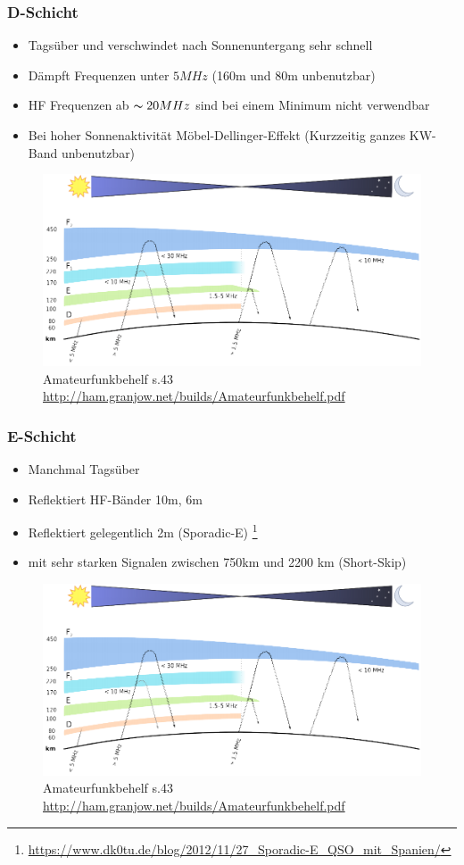 \begin{frame}
  \frametitle{D-Schicht}
  \begin{itemize}
    \item Tagsüber und verschwindet nach Sonnenuntergang sehr schnell
    \item Dämpft Frequenzen unter $5MHz$ (160m und 80m unbenutzbar)
    \item HF Frequenzen ab $\thicksim20MHz$ sind bei einem Minimum nicht verwendbar
    \item Bei hoher Sonnenaktivität Möbel-Dellinger-Effekt (Kurzzeitig ganzes KW-Band unbenutzbar)
  \end{itemize}
  \begin{center}
    \begin{figure}
      \includegraphics[width=.6\textwidth,height=.4\textheight,keepaspectratio]{e09/schichten_behelf_43.png}
      \caption{Amateurfunkbehelf s.43 \ExternalLink \url{http://ham.granjow.net/builds/Amateurfunkbehelf.pdf}}
    \end{figure}
  \end{center}
\end{frame}

\begin{frame}
  \frametitle{E-Schicht}
  \begin{itemize}
    \item Manchmal Tagsüber
    \item Reflektiert HF-Bänder 10m, 6m
    \item Reflektiert gelegentlich 2m (Sporadic-E) \footnote{\tiny \url{https://www.dk0tu.de/blog/2012/11/27_Sporadic-E_QSO_mit_Spanien/}}
    \item mit sehr starken Signalen zwischen 750km und 2200 km (Short-Skip)
  \end{itemize}
  \begin{center}
    \begin{figure}
      \includegraphics[width=.8\textwidth,height=.4\textheight,keepaspectratio]{e09/schichten_behelf_43.png}
      \caption{Amateurfunkbehelf s.43 \ExternalLink \url{http://ham.granjow.net/builds/Amateurfunkbehelf.pdf}}
    \end{figure}
  \end{center}
\end{frame}

